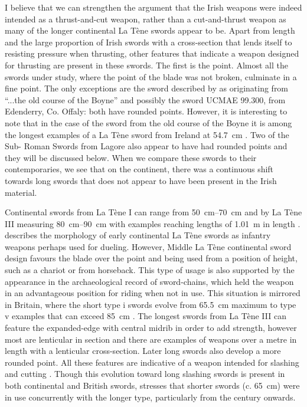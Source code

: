 I believe that we can strengthen the argument that the Irish weapons were indeed intended as a thrust-and-cut weapon, 
rather than a cut-and-thrust weapon as many of the longer continental La Tène swords appear to be. 
Apart from length and the large proportion of Irish swords with a cross-section that lends itself to resisting pressure when thrusting, 
other features that indicate a weapon designed for thrusting are present in these swords. 
The first is the point. 
Almost all the swords under study, where the point of the blade was not broken, culminate in a fine point. 
The only exceptions are the sword described by \textcite[92]{Hencken1950} as originating from “...the old course of the Boyne”  and possibly the sword UCMAE 99.300, from Edenderry, Co. Offaly: both have rounded points. 
However, it is interesting to note that in the case of the sword from the old course of the Boyne it is among the longest examples of a La Tène sword from Ireland at \SI{54.7}{\cm} \parencites[92]{Hencken1950}[93]{Rynne1982}[91]{Raftery1983}. 
Two of the Sub- Roman Swords from Lagore also appear to have had rounded points and they will be discussed below.
When we compare these swords to their contemporaries, we see that on the continent, there was a continuous shift towards long swords that does not appear to have been present in the Irish material. 

Continental swords from La Tène I can range from \SIrange{50}{70}{\cm} and by La Tène III measuring \SIrange{80}{90}{\cm} with examples reaching lengths of \SI{1.01}{\meter} in length \parencites{Pleiner1993}[84, 264, 272, 293, 296]{Stead2006a}[159--161]{Lejars2007}. 
\textcite[50\psq]{Brunaux2004} describes the morphology of early continental La Tène swords as infantry weapons perhaps used for dueling. 
However, Middle La Tène continental sword design favours the blade over the point and being used from a position of height, such as a chariot or from horseback. 
This type of usage is also supported by the appearance in the archaeological record of sword-chains, which held the weapon in an advantageous position for riding when not in use.
This situation is mirrored in Britain, where the short type i swords evolve from \SI{65.5}{\cm} maximum to type v examples that can exceed \SI{85}{\cm} \parencite[8\psq]{Stead2006}. 
The longest swords from La Tène III can feature the expanded-edge with central midrib in order to add strength, however most are lenticular in section and there are examples of weapons over a metre in length with a lenticular cross-section. Later long swords also develop a more rounded point. 
All these features are indicative of a weapon intended for slashing and cutting \parencites[8]{Stead2006}[160]{Lejars2007}. 
Though this evolution toward long slashing swords is present in both continental and British swords, \textcite[160]{Lejars2007} stresses that shorter swords (c. \SI{65}{\cm}) were in use concurrently with the longer type, particularly from the  century \BC onwards. 

